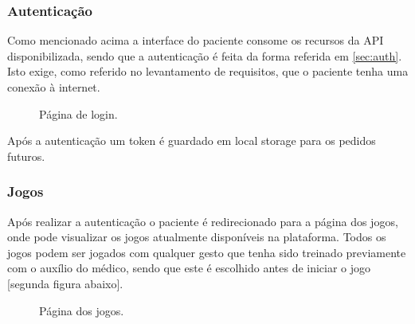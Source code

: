 \documentclass{TTUPhD}
\begin{document}
\subsubsection{Autenticação}

Como mencionado acima a interface do paciente consome os recursos da API disponibilizada, sendo que a autenticação é feita da forma referida em \ref{sec:auth}.
Isto exige, como referido no levantamento de requisitos, que o paciente tenha uma conexão à internet.

\begin{figure}[h!]
    \center
    \caption{Página de login.}
    \label{fig:patient1}
\end{figure}

Após a autenticação um token é guardado em local storage para os pedidos futuros.

\subsubsection{Jogos}

Após realizar a autenticação o paciente é redirecionado para a página dos jogos, onde pode visualizar os jogos atualmente disponíveis na plataforma.
Todos os jogos podem ser jogados com qualquer gesto que tenha sido treinado previamente com o auxílio do médico, sendo que este é escolhido antes de
iniciar o jogo [segunda figura abaixo].

\begin{figure}[h!]
    \center
    \caption{Página dos jogos.}
    \label{fig:patient2}
\end{figure}
\end{document}
